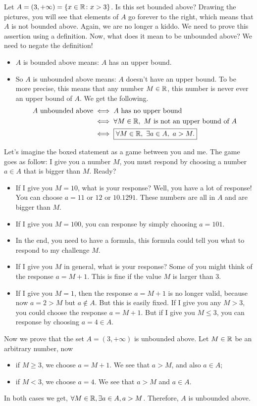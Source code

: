 \documentclass[12pt]{article}
\begin{document}
\begin{example}
  Let \(A = (3, +\infty) = \{x\in\mathbb{R}\colon x> 3\}\).
  Is this set bounded above?
  Drawing the pictures, you will see that elements of \(A\)
  go forever to the right, which means that \(A\) is not bounded above.
  Again, we are no longer a kiddo. We need to prove this assertion
  using a definition. Now, what does it mean to be unbounded above?
  We need to negate the definition!
  \begin{itemize}
  \item \(A\) is bounded above means: \(A\) has an upper bound.
  \item So \(A\) is unbounded above means: \(A\) doesn't have an upper bound.
    To be more precise, this means that any number \(M\in\mathbb{R}\),
    this number is never ever an upper bound of \(A\).
    We get the following.
    \begin{align*}
      A \text{ unbounded above}
      &\iff A \text{ has no upper bound}\\
      &\iff \forall M\in\mathbb{R},~M \text{ is not an upper bound of } A\\
      &\iff \boxed{\forall M\in\mathbb{R},~\exists a\in A,~ a>M.}
    \end{align*}
  \end{itemize}
  Let's imagine the boxed statement as a game between you and me.
  The game goes as follow: I give you a number \(M\),
  you must respond by choosing a number \(a\in A\) that is bigger than \(M\).
  Ready?
  \begin{itemize}
  \item If I give you \(M=10\), what is your response? Well, you have
    a lot of response! You can choose \(a=11\) or \(12\) or \(10.1291\).
    These numbers are all in \(A\) and are bigger than \(M\).
  \item If I give you \(M=100\), you can response by simply choosing \(a=101\).
  \item In the end, you need to have a formula, this formula could tell
    you what to respond to my challenge \(M\).
  \item If I give you \(M\) in general, what is your response?
    Some of you might think of the response \(a=M+1\).
    This is fine if the value \(M\) is larger than \(3\).
  \item If I give you \(M=1\), then the response \(a=M+1\) is no longer valid,
    because now \(a=2>M\) but \(a\notin A\).
    But this is easily fixed. If I give you any \(M>3\),
    you could choose the response \(a = M+1\). But if I give you \(M\leq 3\),
    you can response by choosing \(a=4\in A\).
  \end{itemize}
  Now we prove that the set \(A = (3,+\infty)\) is unbounded above.
  Let \(M\in\mathbb{R}\) be an arbitrary number, now
  \begin{itemize}
  \item if \(M\geq 3\), we choose \(a=M+1\). We see that \(a>M\), and also
    \(a\in A\);
  \item if \(M<3\), we choose \(a = 4\). We see that \(a>M\) and \(a\in A\).
  \end{itemize}
  In both cases we get, \(\forall M\in\mathbb{R},\exists a\in A,a>M\).
  Therefore, \(A\) is unbounded above.


\end{example}
\end{document}
